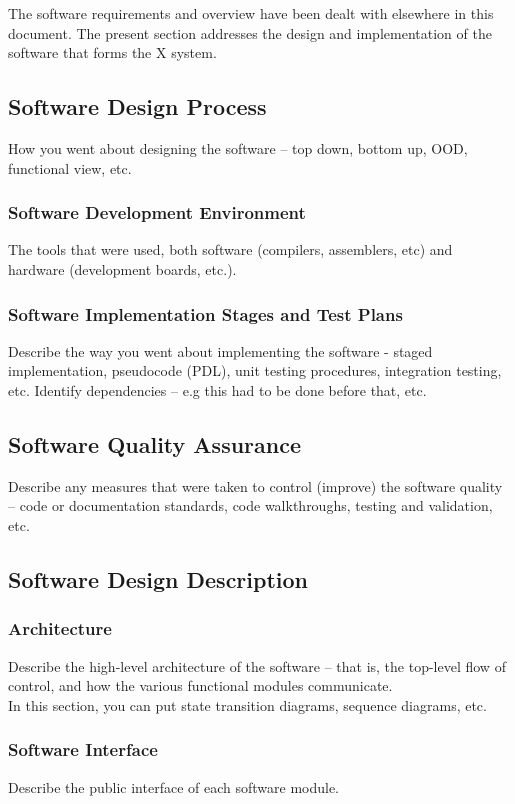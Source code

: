 \documentclass[MTRX3700report.tex]{subfiles}
\begin{document}
The software requirements and overview have been dealt with elsewhere in this document. The present section addresses the design and implementation of the software that forms the X system.
\subsection{Software Design Process}
How you went about designing the software – top down, bottom up, OOD, functional view, etc.
\subsubsection{Software Development Environment}
The tools that were used, both software (compilers, assemblers, etc) and hardware (development boards, etc.).
\subsubsection{Software Implementation Stages and Test Plans}
Describe the way you went about implementing the software - staged implementation, pseudocode (PDL), unit testing procedures, integration testing, etc. Identify dependencies – e.g this had to be done before that, etc.
\subsection{Software Quality Assurance}
Describe any measures that were taken to control (improve) the software quality – code or documentation standards, code walkthroughs, testing and validation, etc.

\subsection{Software Design Description}
\subsubsection{Architecture}
Describe the high-level architecture of the software – that is, the top-level flow of control, and how the various functional modules communicate.\\
In this section, you can put state transition diagrams, sequence diagrams, etc.
\subsubsection{Software Interface}
Describe the public interface of each software module.
\end{document}
